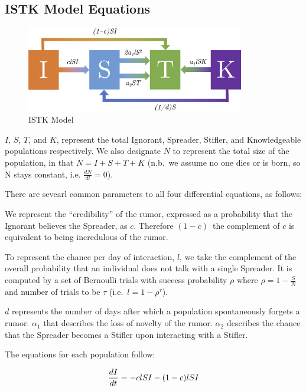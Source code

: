\subsection{ISTK Model Equations}
\label{subsec:istkeqns}

\begin{figure}[H]
\captionsetup{width=0.6\textwidth}
\centering
    \includegraphics[width=0.85\textwidth]{figures/flow-chart}
  \caption{ ISTK Model}
\label{fig:flow-chart}
\end{figure}

\noindent $ I $, $ S $, $ T $, and $ K $, represent the total Ignorant, Spreader, Stifler, and Knowledgeable populations respectively.
We also designate $ N $ to represent the total size of the population, in that $ N = I + S + T + K $ (n.b.\ we assume no one dies or is born, so N stays constant, i.e. $\frac{dN}{dt} = 0$).

There are sevearl common parameters to all four differential equations, as follows:

We represent the ``credibility'' of the rumor, expressed as a probability that the Ignorant believes the Spreader, as $ c $.
Therefore $ (1 - c) $\, the complement of $ c $ is equivalent to being incredulous of the rumor.

To represent the chance per day of interaction, $ l $, we take the complement of the overall probability that an individual does not talk with a single Spreader.
It is computed by a set of Bernoulli trials with success probability $ \rho $ where $ \rho = 1 - \frac{S}{N} $ and number of trials to be $ \tau $ (i.e.~$ l = 1 - \rho^\tau $).

$ d $ represents the number of days after which a population spontaneously forgets a rumor.
$\alpha_1$ that describes the loss of novelty of the rumor.
$ \alpha_2 $ describes the chance that the Spreader becomes a Stifler upon interacting with a Stifler.

The equations for each population follow:

\begin{equation}
\label{eqn:istk_exp_i}
\frac{dI}{dt}  = - clSI - (1-c)lSI \\
\end{equation}

